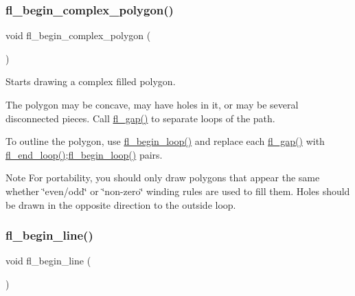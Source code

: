 \subsubsection{\texorpdfstring{fl\+\_\+begin\+\_\+complex\+\_\+polygon()}{fl\_begin\_complex\_polygon()}}
{\footnotesize\ttfamily void fl\+\_\+begin\+\_\+complex\+\_\+polygon (\begin{DoxyParamCaption}{ }\end{DoxyParamCaption})\hspace{0.3cm}{\ttfamily [inline]}}

Starts drawing a complex filled polygon.

The polygon may be concave, may have holes in it, or may be several disconnected pieces. Call \hyperlink{group__fl__drawings_ga29448f3a419a65645e3f082c65d1df14}{fl\+\_\+gap()} to separate loops of the path.

To outline the polygon, use \hyperlink{group__fl__drawings_ga3cac8693d88eeec879f909ba03007686}{fl\+\_\+begin\+\_\+loop()} and replace each \hyperlink{group__fl__drawings_ga29448f3a419a65645e3f082c65d1df14}{fl\+\_\+gap()} with \hyperlink{group__fl__drawings_ga5b2013850fe739839e437ef942602532}{fl\+\_\+end\+\_\+loop()};\hyperlink{group__fl__drawings_ga3cac8693d88eeec879f909ba03007686}{fl\+\_\+begin\+\_\+loop()} pairs.

\begin{DoxyNote}{Note}
For portability, you should only draw polygons that appear the same whether \char`\"{}even/odd\char`\"{} or \char`\"{}non-\/zero\char`\"{} winding rules are used to fill them. Holes should be drawn in the opposite direction to the outside loop. 
\end{DoxyNote}
\mbox{\label{group__fl__drawings_gae6a88cd889c957813dc6dc849876b532}} 
\subsubsection{\texorpdfstring{fl\+\_\+begin\+\_\+line()}{fl\_begin\_line()}}
{\footnotesize\ttfamily void fl\+\_\+begin\+\_\+line (\begin{DoxyParamCaption}{ }\end{DoxyParamCaption})\hspace{0.3cm}{\ttfamily [inline]}}

